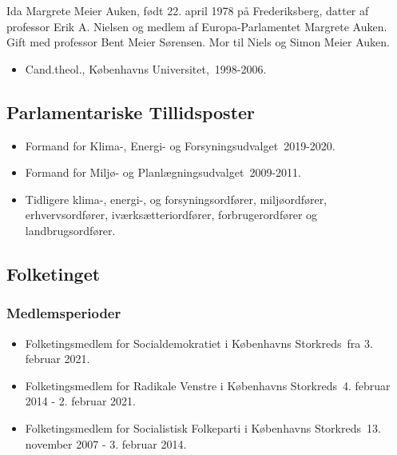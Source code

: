 \documentclass[11pt, a4paper]{awesome-cv}
\begin{document}
\makecvheader[R]
\makelettertitle
\begin{cvletter}
Ida Margrete Meier Auken, født 22. april 1978 på Frederiksberg, datter af professor Erik A. Nielsen og medlem af Europa-Parlamentet Margrete Auken. Gift med professor Bent Meier Sørensen. Mor til Niels og Simon Meier Auken.

\begin{itemize}
\item Cand.theol., Københavns Universitet, 1998-2006.
\end{itemize}
\subsection*{Parlamentariske Tillidsposter}
\begin{itemize}
\item Formand for Klima-, Energi- og Forsyningsudvalget 2019-2020.
\item Formand for Miljø- og Planlægningsudvalget 2009-2011.
\item Tidligere klima-, energi-, og forsyningsordfører, miljøordfører, erhvervsordfører, iværksætteriordfører, forbrugerordfører og landbrugsordfører.
\end{itemize}
\subsection*{Folketinget}
\subsubsection*{Medlemsperioder}
\begin{itemize}
\item Folketingsmedlem for Socialdemokratiet i Københavns Storkreds fra 3. februar 2021.
\item Folketingsmedlem for Radikale Venstre i Københavns Storkreds 4. februar 2014 - 2. februar 2021.
\item Folketingsmedlem for Socialistisk Folkeparti i Københavns Storkreds 13. november 2007 - 3. februar 2014.
\end{itemize}

\end{cvletter}
\end{document}
